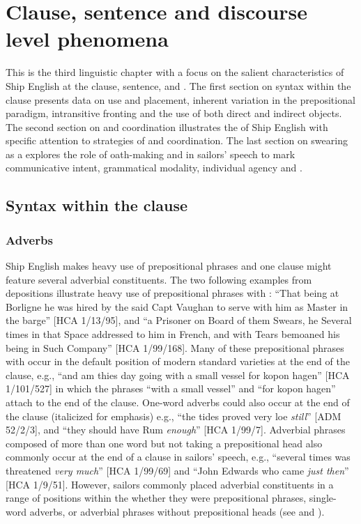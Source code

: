 \chapter{{Clause, sentence and discourse level phenomena}}

This is the third linguistic chapter with a focus on the salient characteristics of Ship English at the clause, sentence, and . The first section on syntax within the clause presents data on  use and placement, inherent variation in the prepositional paradigm, intransitive  fronting and the use of both direct and indirect objects. The second section on  and coordination illustrates the  of Ship English with specific attention to strategies of  and coordination. The last section on swearing as a  explores the role of oath-making and  in sailors’ speech to mark communicative intent, grammatical modality, individual agency and . 

\section{{Syntax within the clause}}%

\subsection{{Adverbs}}%

Ship English makes heavy use of prepositional phrases and one clause might feature several adverbial constituents. The two following examples from depositions illustrate heavy use of prepositional phrases with : “That being at Borligne he was hired by the said Capt Vaughan to serve with him as Master in the barge” [HCA 1/13/95], and “a Prisoner on Board of them Swears, he Several times in that Space addressed to him in French, and with Tears bemoaned his being in Such Company” [HCA 1/99/168]. Many of these prepositional phrases with  occur in the default position of modern standard varieties at the end of the clause, e.g., “and am thies day going with a small vessel for kopon hagen” [HCA 1/101/527] in which the phrases “with a small vessel” and “for kopon hagen” attach to the end of the clause. One-word adverbs could also occur at the end of the clause (italicized for emphasis) e.g., “the tides proved very loe \textit{still}” [ADM 52/2/3], and “they should have Rum \textit{enough}” [HCA 1/99/7]. Adverbial phrases composed of more than one word but not taking a prepositional head also commonly occur at the end of a clause in sailors’ speech, e.g., “several times was threatened \textit{very much}” [HCA 1/99/69] and “John Edwards who came \textit{just then}” [HCA 1/9/51]. However, sailors commonly placed adverbial constituents in a range of positions within the  whether they were prepositional phrases, single-word adverbs, or adverbial phrases without prepositional heads (see  and ). 

